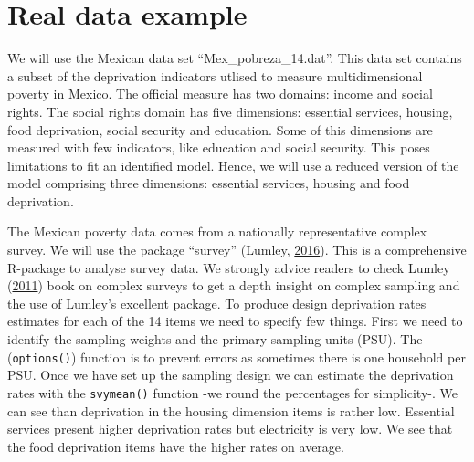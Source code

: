 \documentclass[]{book}
\begin{document}
\hypertarget{real-data-example}{%
\section{Real data example}\label{real-data-example}}

We will use the Mexican data set ``Mex\_pobreza\_14.dat''. This data set contains a subset of the deprivation indicators utlised to measure multidimensional poverty in Mexico. The official measure has two domains: income and social rights. The social rights domain has five dimensions: essential services, housing, food deprivation, social security and education. Some of this dimensions are measured with few indicators, like education and social security. This poses limitations to fit an identified model. Hence, we will use a reduced version of the model comprising three dimensions: essential services, housing and food deprivation.

The Mexican poverty data comes from a nationally representative complex survey. We will use the package ``survey'' (Lumley, \protect\hyperlink{ref-Lumley2016}{2016}). This is a comprehensive R-package to analyse survey data. We strongly advice readers to check Lumley (\protect\hyperlink{ref-Lumley2011}{2011}) book on complex surveys to get a depth insight on complex sampling and the use of Lumley's excellent package. To produce design deprivation rates estimates for each of the 14 items we need to specify few things. First we need to identify the sampling weights and the primary sampling units (PSU). The (\texttt{options()}) function is to prevent errors as sometimes there is one household per PSU. Once we have set up the sampling design we can estimate the deprivation rates with the \texttt{svymean()} function -we round the percentages for simplicity-. We can see than deprivation in the housing dimension items is rather low. Essential services present higher deprivation rates but electricity is very low. We see that the food deprivation items have the higher rates on average.
\end{document}
